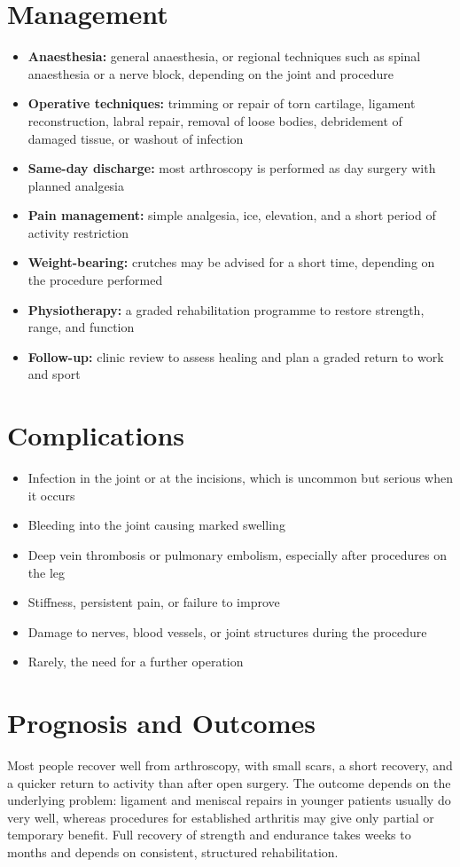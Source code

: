 \section*{Management}
\begin{itemize}
    \item \textbf{Anaesthesia:} general anaesthesia, or regional techniques such as spinal anaesthesia or a nerve block, depending on the joint and procedure
    \item \textbf{Operative techniques:} trimming or repair of torn cartilage, ligament reconstruction, labral repair, removal of loose bodies, debridement of damaged tissue, or washout of infection
    \item \textbf{Same-day discharge:} most arthroscopy is performed as day surgery with planned analgesia
    \item \textbf{Pain management:} simple analgesia, ice, elevation, and a short period of activity restriction
    \item \textbf{Weight-bearing:} crutches may be advised for a short time, depending on the procedure performed
    \item \textbf{Physiotherapy:} a graded rehabilitation programme to restore strength, range, and function
    \item \textbf{Follow-up:} clinic review to assess healing and plan a graded return to work and sport
\end{itemize}

\section*{Complications}
\begin{itemize}
    \item Infection in the joint or at the incisions, which is uncommon but serious when it occurs
    \item Bleeding into the joint causing marked swelling
    \item Deep vein thrombosis or pulmonary embolism, especially after procedures on the leg
    \item Stiffness, persistent pain, or failure to improve
    \item Damage to nerves, blood vessels, or joint structures during the procedure
    \item Rarely, the need for a further operation
\end{itemize}

\section*{Prognosis and Outcomes}
Most people recover well from arthroscopy, with small scars, a short recovery, and a quicker return to activity than after open surgery. The outcome depends on the underlying problem: ligament and meniscal repairs in younger patients usually do very well, whereas procedures for established arthritis may give only partial or temporary benefit. Full recovery of strength and endurance takes weeks to months and depends on consistent, structured rehabilitation.

